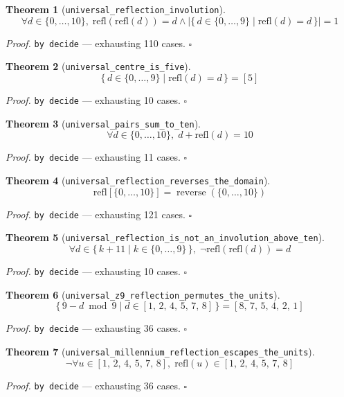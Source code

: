 \documentclass[11pt]{article}
\newtheorem{theorem}{Theorem}[section]
\begin{document}
\begin{theorem}[\texttt{universal\_reflection\_involution}]
\[ \forall d \in \{0,\dots,10\},\; \mathrm{refl}\mathopen{}\left(\mathrm{refl}\mathopen{}\left(d\right)\right) = d \land \left|\{\, d \in \{0,\dots,9\} \mid \mathrm{refl}\mathopen{}\left(d\right) = d \,\}\right| = 1 \]
\end{theorem}
\noindent\emph{Proof.} \texttt{by decide} --- exhausting 110 cases. \hfill$\square$

\begin{theorem}[\texttt{universal\_centre\_is\_five}]
\[ \{\, d \in \{0,\dots,9\} \mid \mathrm{refl}\mathopen{}\left(d\right) = d \,\} = [5] \]
\end{theorem}
\noindent\emph{Proof.} \texttt{by decide} --- exhausting 10 cases. \hfill$\square$

\begin{theorem}[\texttt{universal\_pairs\_sum\_to\_ten}]
\[ \forall d \in \{0,\dots,10\},\; d + \mathrm{refl}\mathopen{}\left(d\right) = 10 \]
\end{theorem}
\noindent\emph{Proof.} \texttt{by decide} --- exhausting 11 cases. \hfill$\square$

\begin{theorem}[\texttt{universal\_reflection\_reverses\_the\_domain}]
\[ \mathrm{refl}[\{0,\dots,10\}] = \operatorname{reverse}\left(\{0,\dots,10\}\right) \]
\end{theorem}
\noindent\emph{Proof.} \texttt{by decide} --- exhausting 121 cases. \hfill$\square$

\begin{theorem}[\texttt{universal\_reflection\_is\_not\_an\_involution\_above\_ten}]
\[ \forall d \in \{\, k + 11 \mid k \in \{0,\dots,9\} \,\},\; \lnot \mathrm{refl}\mathopen{}\left(\mathrm{refl}\mathopen{}\left(d\right)\right) = d \]
\end{theorem}
\noindent\emph{Proof.} \texttt{by decide} --- exhausting 10 cases. \hfill$\square$

\begin{theorem}[\texttt{universal\_z9\_reflection\_permutes\_the\_units}]
\[ \{\, 9 - d \bmod 9 \mid d \in [1,\,2,\,4,\,5,\,7,\,8] \,\} = [8,\,7,\,5,\,4,\,2,\,1] \]
\end{theorem}
\noindent\emph{Proof.} \texttt{by decide} --- exhausting 36 cases. \hfill$\square$

\begin{theorem}[\texttt{universal\_millennium\_reflection\_escapes\_the\_units}]
\[ \lnot \forall u \in [1,\,2,\,4,\,5,\,7,\,8],\; \mathrm{refl}\mathopen{}\left(u\right) \in [1,\,2,\,4,\,5,\,7,\,8] \]
\end{theorem}
\noindent\emph{Proof.} \texttt{by decide} --- exhausting 36 cases. \hfill$\square$
\end{document}
